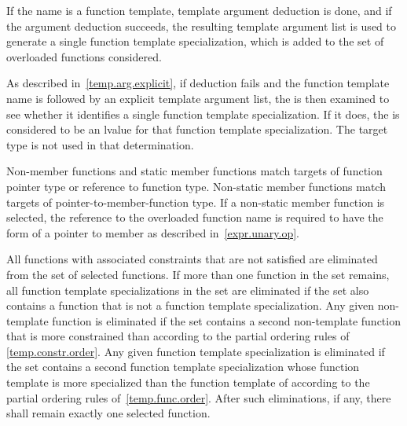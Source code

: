 \pnum
If the name is a function template, template argument deduction is
done, and if the argument deduction succeeds,
the
resulting template argument list is
used to generate a single
function template specialization,
which is added to the set of overloaded functions
considered.
\begin{note}
As described in~\ref{temp.arg.explicit}, if deduction fails and the
function template name is followed by an explicit template argument list,
the
is then examined to see whether it identifies a single function template
specialization. If it does, the
is considered to be an lvalue for that function template specialization.
The target type is not used in that determination.
\end{note}

\pnum
Non-member functions and static member functions
match targets of function pointer type or
reference to function type.
Non-static member functions match targets of
pointer-to-member-function type.
If a non-static member function is selected, the reference to the overloaded
function name is required to have the form of a pointer to member as
described in~\ref{expr.unary.op}.

\pnum
All functions with
associated constraints
that are not satisfied
are eliminated from the set of selected functions.
If more than one function in the set remains,
all function template specializations
in the set
are eliminated if the set also contains a function that is not a
function template specialization.
Any given non-template function
is eliminated if the set contains a second
non-template function that
is more constrained than
according to
the partial ordering rules of \ref{temp.constr.order}.
Any given
function template specialization
is eliminated if the set contains a second
function template specialization whose function template
is more specialized than the
function template of
according to
the partial ordering rules of~\ref{temp.func.order}.
After such eliminations,
if any, there shall remain exactly one selected function.

